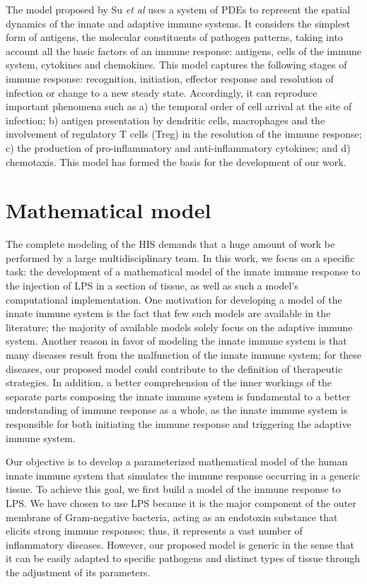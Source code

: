 \documentclass[10pt]{bmc_article}
\newenvironment{bmcformat}{\baselineskip20pt\sloppy\setboolean{publ}{false}}{\baselineskip20pt\sloppy}
\begin{document}
\begin{bmcformat}
The model proposed by Su \textit{et al} \cite{localmodel} uses a system of PDEs to represent the spatial dynamics of the innate and 
adaptive immune systems. It considers the simplest form of antigens, the molecular constituents of pathogen patterns, taking into 
account all the basic factors of an immune response: antigens, cells of the immune system, cytokines and chemokines. This model 
captures the following stages of immune response: recognition, initiation, effector response and resolution of infection or change 
to a new steady state. Accordingly, it can reproduce important phenomena such as a) the temporal order of cell arrival at the site 
of infection; b) antigen presentation by dendritic cells, macrophages and the involvement of regulatory T cells (Treg) in the
resolution of the immune response; c) the production of pro-inflammatory and anti-inflammatory cytokines; and d) chemotaxis. This 
model has formed the basis for the development of our work.

\section*{Mathematical model}\label{mathmodel}

The complete modeling of the HIS demands that a huge amount of work be performed by a large multidisciplinary team. In this work, 
we focus on a specific task: the development of a mathematical model of the innate immune response to the injection of LPS in a 
section of tissue, as well as such a model's computational implementation. One motivation for developing a model of the innate 
immune system is the fact that few such models are available in the literature; the majority of available models solely focus on 
the adaptive immune system. Another reason in favor of modeling the innate immune system is that many diseases result from the 
malfunction of the innate immune system; for these diseases, our proposed model could contribute to the definition of therapeutic 
strategies. In addition, a better comprehension of the inner workings of the separate parts composing the innate immune system is 
fundamental to a better understanding of immune response as a whole, as the innate immune system is responsible for both initiating 
the immune response and triggering the adaptive immune system. 

Our objective is to develop a parameterized mathematical model of the human innate immune system that simulates the immune response 
occurring in a generic tissue. To achieve this goal, we first build a model of the immune response to LPS. We have chosen to use
LPS because it is the major component of the outer membrane of Gram-negative bacteria, acting as an endotoxin substance that elicits 
strong immune responses; thus, it represents a vast number of inflammatory diseases. However, our proposed model is generic in the 
sense that it can be easily adapted to specific pathogens and distinct types of tissue through the adjustment of its parameters.


\end{bmcformat}
\end{document}
